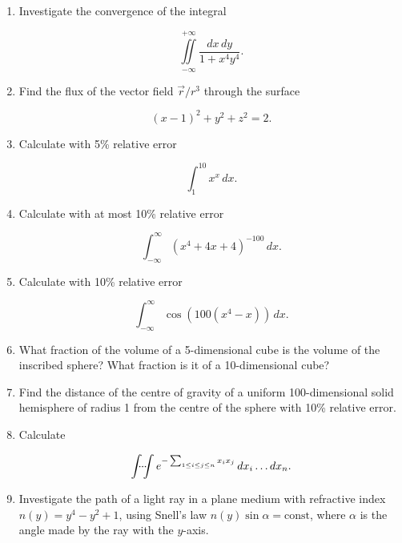 \documentclass{article}
\begin{document}
\begin{enumerate}
\item Investigate the convergence of the integral

  \begin{equation*}
    \iint \limits_{-\infty}^{+\infty} \frac{dx\,dy}{1 + x^4y^4}.
  \end{equation*}

\item Find the flux of the vector field $\vec{r}/r^3$ through the surface

  \begin{equation*}
    (x - 1)^2 + y^2 + z^2 = 2 .
  \end{equation*}

\item Calculate with 5\% relative error

  \begin{equation*}
    \int_{1}^{10} x^x \,dx.
  \end{equation*}

\item Calculate with at most 10\% relative error

  \begin{equation*}
    \int_{-\infty}^{\infty} (x^4 + 4x + 4)^{-100} \,dx.
  \end{equation*}

\item Calculate with 10\% relative error

  \begin{equation*}
    \int_{-\infty}^{\infty} \cos(100(x^4 -x)) \,dx.
  \end{equation*}

\item What fraction of the volume of a 5-dimensional cube is the volume of the
  inscribed sphere? What fraction is it of a 10-dimensional cube?

\item Find the distance of the centre of gravity of a uniform 100-dimensional
  solid hemisphere of radius 1 from the centre of the sphere with 10\% relative
  error.

\item Calculate

  \begin{equation*}
    \idotsint e^{-\sum_{1 \leq i \leq j \leq n} x_i x_j} \,dx_i \dots dx_n.
  \end{equation*}

\item Investigate the path of a light ray in a plane medium with refractive
  index $n(y) = y^4 - y^2 + 1$, using Snell's law
  $n(y) \sin \alpha = \text{const}$, where $\alpha$ is the angle made by the ray
  with the $y$-axis.


\end{enumerate}
\end{document}
